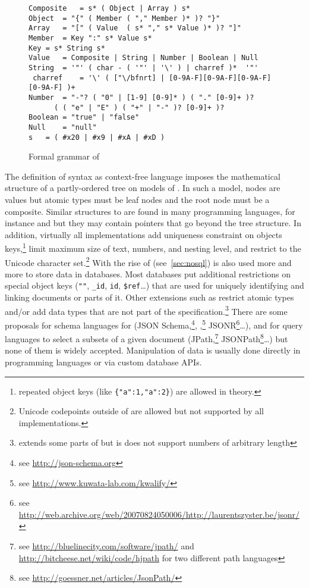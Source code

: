 \begin{figure}[h]
\centering
\begin{lstlisting}[language=BNF,tabsize=11]
Composite	= s* ( Object | Array ) s*
Object	= "{" ( Member ( "," Member )* )? "}"
Array	= "[" ( Value  ( s* "," s* Value )* )? "]"
Member	= Key ":" s* Value s*
Key	= s* String s*
Value	= Composite | String | Number | Boolean | Null
String	= '"' ( char - ( '"' | '\' ) | charref )*  '"'
 charref	= '\' ( ["\/bfnrt] | [0-9A-F][0-9A-F][0-9A-F][0-9A-F] )+
Number	= "-"? ( "0" | [1-9] [0-9]* ) ( "." [0-9]+ )? 
	  ( ( "e" | "E" ) ( "+" | "-" )? [0-9]+ )?
Boolean	= "true" | "false"
Null	= "null"
s	= ( #x20 | #x9 | #xA | #xD )
\end{lstlisting}
\caption{Formal grammar of }
\label{fig:jsonbnf}
\end{figure}

The definition of  syntax as context-free language imposes 
the mathematical structure of a partly-ordered tree on models of
. In such a model, nodes are values but atomic types
must be leaf nodes and the root node must be a composite.
Similar structures to  are found in many programming languages, 
for instance  and  but they may contain
pointers that go beyond the tree structure. In addition, virtually all
implementations add uniqueness constraint on objects keys,\footnote{repeated 
object keys (like \texttt{\{"a":1,"a":2\}}) are allowed in theory.}
limit maximum size of text, numbers, and nesting level, and restrict 
 to the Unicode character set.\footnote{Unicode codepoints
outside of  are allowed but not supported by all
implementations.} With the rise of  (see~\ref{sec:nosql})
 is also used more and more to store data in databases. Most 
 databases put additional restrictions on special object keys
(\texttt{""}, \texttt{\_id}, \texttt{id}, \texttt{\$ref}\ldots) that are 
used for uniquely identifying and linking  documents or parts 
of it. Other extensions such as  restrict atomic 
types and/or add data types that are not part of the  
specification.\footnote{ extends some parts of 
but is does not support numbers of arbitrary length}
There are some proposals for schema languages for 
(JSON Schema,\footnote{see \url{http://json-schema.org}},
,\footnote{see \url{http://www.kuwata-lab.com/kwalify/}}
JSONR\footnote{see \url{http://web.archive.org/web/20070824050006/http://laurentszyster.be/jsonr/}}\ldots), and for 
query languages to select a subsets of a given  document
(JPath,\footnote{see \url{http://bluelinecity.com/software/jpath/} and
\url{http://bitcheese.net/wiki/code/hjpath} for two different 
path languages}
JSONPath\footnote{see \url{http://goessner.net/articles/JsonPath/}}\ldots) but
none of them is widely accepted. Manipulation of  data is usually
done directly in programming languages or via custom database APIs.

